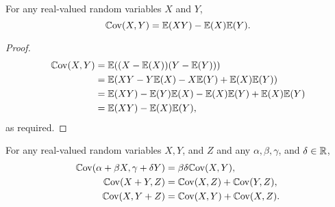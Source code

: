 \documentclass[10pt, a4paper]{article}
\begin{document}
\begin{corollary}
    For any real-valued random variables $X$ and $Y$,
    \[
    \mathbb{C}\mathrm{ov}(X, Y) = \mathbb{E}(XY) - \mathbb{E}(X)\mathbb{E}(Y).
    \]
    \begin{proof}
        \begin{align*}
            \mathbb{C}\mathrm{ov}(X, Y) &= \mathbb{E}((X - \mathbb{E}(X))(Y - \mathbb{E}(Y))) \\
            &= \mathbb{E}(XY - Y\mathbb{E}(X) - X\mathbb{E}(Y) + \mathbb{E}(X)\mathbb{E}(Y)) \\
            &= \mathbb{E}(XY) - \mathbb{E}(Y)\mathbb{E}(X) - \mathbb{E}(X)\mathbb{E}(Y) + \mathbb{E}(X)\mathbb{E}(Y) \\
            &= \mathbb{E}(XY) - \mathbb{E}(X)\mathbb{E}(Y),
        \end{align*}
        as required.
    \end{proof}
\end{corollary}

\begin{corollary}
    For any real-valued random variables $X, Y$,
    and $Z$ and any $\alpha, \beta, \gamma$,
    and $\delta \in \mathbb{R}$,
    \begin{align*}
        \mathbb{C}\mathrm{ov}(\alpha + \beta X, \gamma + \delta Y) &= \beta\delta\mathbb{C}\mathrm{ov}(X, Y), \\
        \mathbb{C}\mathrm{ov}(X + Y, Z) &= \mathbb{C}\mathrm{ov}(X, Z) + \mathbb{C}\mathrm{ov}(Y, Z), \\
        \mathbb{C}\mathrm{ov}(X, Y + Z) &= \mathbb{C}\mathrm{ov}(X, Y) + \mathbb{C}\mathrm{ov}(X, Z).
    \end{align*}
\end{corollary}
\end{document}
